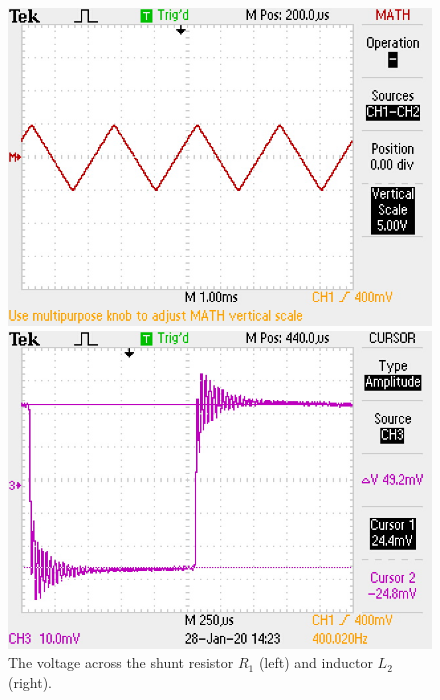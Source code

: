 \documentclass{report}
\begin{document}
\begin{figure}[H]
	\begin{minipage}{0.5\linewidth}
		\includegraphics[width=\linewidth]{scope/ramp_vr}
	\end{minipage}
	\begin{minipage}{0.5\linewidth}
		\includegraphics[width=\linewidth]{scope/ramp_v2}
	\end{minipage}
	\caption{The voltage across the shunt resistor $R_1$ (left) and inductor $L_2$ (right).}
	\label{fig:1scope}
\end{figure}
\end{document}
